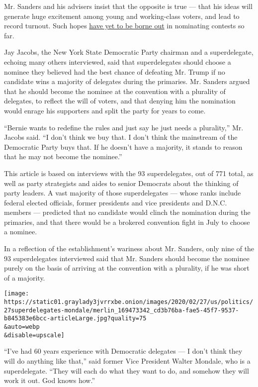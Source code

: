 Mr. Sanders and his advisers insist that the opposite is true --- that
his ideas will generate huge excitement among young and working-class
voters, and lead to record turnout. Such hopes
\href{https://www.nytimes3xbfgragh.onion/2020/02/24/us/politics/bernie-sanders-democratic-voters.html}{have
yet to be borne out} in nominating contests so far.

Jay Jacobs, the New York State Democratic Party chairman and a
superdelegate, echoing many others interviewed, said that superdelegates
should choose a nominee they believed had the best chance of defeating
Mr. Trump if no candidate wins a majority of delegates during the
primaries. Mr. Sanders argued that he should become the nominee at the
convention with a plurality of delegates, to reflect the will of voters,
and that denying him the nomination would enrage his supporters and
split the party for years to come.

``Bernie wants to redefine the rules and just say he just needs a
plurality,'' Mr. Jacobs said. ``I don't think we buy that. I don't think
the mainstream of the Democratic Party buys that. If he doesn't have a
majority, it stands to reason that he may not become the nominee.''

This article is based on interviews with the 93 superdelegates, out of
771 total, as well as party strategists and aides to senior Democrats
about the thinking of party leaders. A vast majority of those
superdelegates --- whose ranks include federal elected officials, former
presidents and vice presidents and D.N.C. members --- predicted that no
candidate would clinch the nomination during the primaries, and that
there would be a brokered convention fight in July to choose a nominee.

In a reflection of the establishment's wariness about Mr. Sanders, only
nine of the 93 superdelegates interviewed said that Mr. Sanders should
become the nominee purely on the basis of arriving at the convention
with a plurality, if he was short of a majority.

\texttt{[image: https://static01.graylady3jvrrxbe.onion/images/2020/02/27/us/politics/27superdelegates-mondale/merlin\_169473342\_cd3b76ba-fae5-45f7-9537-b845383e6bcc-articleLarge.jpg?quality=75\\\&auto=webp\\\&disable=upscale]}

``I've had 60 years experience with Democratic delegates --- I don't
think they will do anything like that,'' said former Vice President
Walter Mondale, who is a superdelegate. ``They will each do what they
want to do, and somehow they will work it out. God knows how.''

